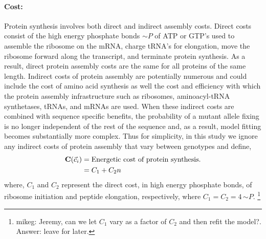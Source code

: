 \documentclass{article}
\newcommand{\Costcveci}{\ensuremath{\Cost(\cveci)}\xspace}
\newcommand{\Cost}{\ensuremath{\text{\textbf{C}}}\xspace}
\newcommand{\simP}{\ensuremath{\sim P}\xspace}
\newcommand{\cveci}{\ensuremath{\cvec_i}\xspace}
\newcommand{\cvec}{\ensuremath{\Vec{c}}\xspace}
\begin{document}
\paragraph*{Cost:}
Protein synthesis involves both direct and indirect assembly costs.
Direct costs consist of the high energy phosphate bonds \simP of ATP or GTP's used to assemble the ribosome on the mRNA, charge tRNA's for elongation, move the ribosome forward along the transcript, and terminate protein synthesis.
As a result, direct protein assembly costs are the same for all proteins of the same length.
Indirect costs of protein assembly are potentially numerous and could include the cost of amino acid synthesis as well the cost and efficiency with which the protein assembly infrastructure such as ribosomes, aminoacyl-tRNA synthetases, tRNAs, and mRNAs are used.
When these indirect costs are combined with sequence specific benefits, the probability of a mutant allele fixing is no longer independent of the rest of the sequence \citep{GilchristEtAl2015} and, as a result, model fitting becomes substantially more complex.
Thus for simplicity, in this study we ignore any indirect costs of protein assembly that vary between genotypes and define,
\begin{align}
\label{eq:defineCost}
  \Costcveci  &= \text{Energetic cost of protein synthesis.}\\
  &= C_1 + C_2 n
\end{align}
where, $C_1$ and $C_2$ represent the direct cost, in high energy phosphate bonds, of ribosome initiation and peptide elongation, respectively, where $C_1 = C_2 = 4  \, \simP$.
\footnote{mikeg: Jeremy, can we let $C_1$ vary as a factor of $C_2$ and then refit the model?.
Answer: leave for later.}
\end{document}
